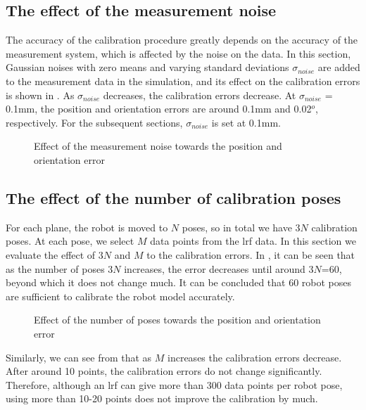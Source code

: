 \subsection{The effect of the measurement noise}
\label{sec:meas_accuracy}
The accuracy of the calibration procedure greatly depends on the accuracy of the measurement system, which is affected by the noise on the data. In this section, Gaussian noises with zero means and varying standard deviations $\sigma_{noise}$ are added to the measurement data in the simulation, and its effect on the calibration errors is shown in . As $\sigma_{noise}$ decreases, the calibration errors decrease. At $\sigma_{noise}$ = 0.1mm, the position and orientation errors are around 0.1mm and 0.02$^o$, respectively. For the subsequent sections, $\sigma_{noise}$ is set at 0.1mm. 
\begin{figure}[h]
  \centering
  \caption{Effect of the measurement noise towards the position and orientation error} 
  \label{fig:laser_noise}
\end{figure}


\subsection{The effect of the number of calibration poses}
\label{sec:calib_poses}
For each plane, the robot is moved to $N$ poses, so in total we have $3N$ calibration poses. At each pose, we select $M$ data points from the \ac{lrf} data. In this section we evaluate the effect of $3N$ and $M$ to the calibration errors. In , it can be seen that as the number of poses $3N$ increases, the error decreases until around $3N$=60, beyond which it does not change much. It can be concluded that 60 robot poses are sufficient to calibrate the robot model accurately. 

\begin{figure}[h]
  \centering
  \caption{Effect of the number of poses towards the position and orientation error} 
  \label{fig:num_of_poses}
\end{figure}

Similarly, we can see from  that as $M$ increases the calibration errors decrease. After around 10 points, the calibration errors do not change significantly. Therefore, although an \ac{lrf} can give more than 300 data points per robot pose, using more than 10-20 points does not improve the calibration by much. 

